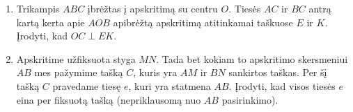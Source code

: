 \begin{enumerate}
\item Trikampis $ABC$ įbrėžtas į apskritimą su centru $O$.
  Tiesės $AC$ ir $BC$ antrą kartą kerta apie $AOB$ apibrėžtą
  apskritimą atitinkamai taškuose $E$ ir $K$.  Įrodyti, kad
  $OC\perp{EK}$.
\item Apskritime užfiksuota styga $MN$. Tada bet kokiam to
  apskritimo skersmeniui $AB$ mes pažymime tašką $C$, kuris
  yra $AM$ ir $BN$ sankirtos taškas. Per šį tašką $C$
  pravedame tiesę $e$, kuri yra statmena $AB$. Įrodyti, kad
  visos tiesės $e$ eina per fiksuotą tašką (nepriklausomą
  nuo $AB$ pasirinkimo).

\end{enumerate}
